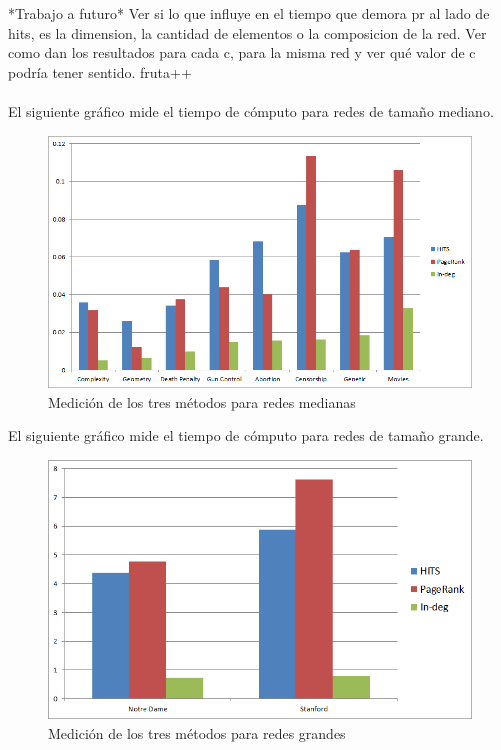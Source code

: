 \documentclass[a4paper]{article}
\begin{document}
*Trabajo a futuro*
Ver si lo que influye en el tiempo que demora pr al lado de hits, es la dimension, la cantidad de elementos o la composicion de la red.
Ver como dan los resultados para cada c, para la misma red y ver qué valor de c podría tener sentido. fruta++ \\
\\
El siguiente gr\'afico mide el tiempo de c\'omputo para redes de tama\~no mediano.

\begin{figure}[h!]
  \begin{center}
	\includegraphics[scale=0.50]{imagenes/expTiempo/tiemposMedianos.png}
	\caption{Medici\'on de los tres m\'etodos para redes medianas}
	\label{nombreparareferenciar}
  \end{center}
\end{figure}

El siguiente gr\'afico mide el tiempo de c\'omputo para redes de tama\~no grande.\\
\begin{figure}[h!]
  \begin{center}
	\includegraphics[scale=0.50]{imagenes/expTiempo/tiemposGrandes.png}
	\caption{Medici\'on de los tres m\'etodos para redes grandes}
	\label{nombreparareferenciar}
  \end{center}
\end{figure}
\end{document}
